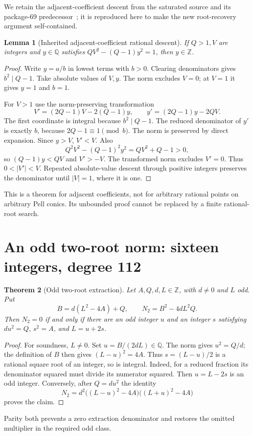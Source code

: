 \documentclass[11pt,letterpaper]{article}
\newtheorem{theorem}{Theorem}[section]
\newtheorem{lemma}[theorem]{Lemma}
\theoremstyle{remark}\newtheorem{remark}[theorem]{Remark}
\newcommand{\Z}{\mathbb Z}\newcommand{\N}{\mathbb N}\newcommand{\Q}{\mathbb Q}
\begin{document}
We retain the adjacent-coefficient descent from the saturated source
and its package-69 predecessor~\cite{sat}; it is reproduced here to make
the new root-recovery argument self-contained.
\begin{lemma}[Inherited adjacent-coefficient rational descent]\label{lem:descent}
If $Q>1,V$ are integers and $y\in\Q$ satisfies
$QV^2-(Q-1)y^2=1$, then $y\in\Z$.
\end{lemma}
\begin{proof}
Write $y=a/b$ in lowest terms with $b>0$. Clearing denominators gives
$b^2\mid Q-1$. Take absolute values of $V,y$. The norm excludes $V=0$;
at $V=1$ it gives $y=1$ and $b=1$.

For $V>1$ use the norm-preserving transformation
\[
 V'=(2Q-1)V-2(Q-1)y,\qquad y'=(2Q-1)y-2QV.
\]
The first coordinate is integral because $b^2\mid Q-1$.
The reduced denominator of $y'$ is exactly $b$, because
$2Q-1\equiv1\pmod b$. The norm is preserved by direct expansion.
Since $y>V$, $V'<V$. Also
\[
 Q^2V^2-(Q-1)^2y^2=QV^2+Q-1>0,
\]
so $(Q-1)y<QV$ and $V'>-V$. The transformed norm excludes $V'=0$.
Thus $0<|V'|<V$. Repeated absolute-value descent through positive
integers preserves the denominator until $|V|=1$, where it is one.
\end{proof}
This is a theorem for adjacent coefficients, not for arbitrary rational
points on arbitrary Pell conics. Its unbounded proof cannot be replaced
by a finite rational-root search.

\section{An odd two-root norm: sixteen integers, degree 112}
\label{sec:sixteen}

\begin{theorem}[Odd two-root extraction]\label{thm:two}
Let $A,Q,d,L\in\Z$, with $d\ne0$ and $L$ odd. Put
\[
 B=d(L^2-4A)+Q,\qquad N_2=B^2-4dL^2Q.
\]
Then $N_2=0$ if and only if there are an odd integer $u$ and an integer
$s$ satisfying $du^2=Q$, $s^2=A$, and $L=u+2s$.
\end{theorem}
\begin{proof}
For soundness, $L\ne0$. Set $u=B/(2dL)\in\Q$.
The norm gives $u^2=Q/d$; the definition of $B$ then gives
$(L-u)^2=4A$. Thus $s=(L-u)/2$ is a rational square root of an integer,
so is integral. Indeed, for a reduced fraction its denominator squared
must divide its numerator squared. Then $u=L-2s$ is an odd integer.
Conversely, after $Q=du^2$ the identity
\[
 N_2=d^2\bigl((L-u)^2-4A\bigr)\bigl((L+u)^2-4A\bigr)
\]
proves the claim.
\end{proof}
Parity both prevents a zero extraction denominator and restores the
omitted multiplier in the required odd class.
\end{document}

